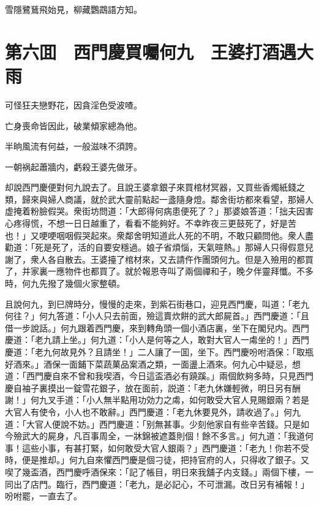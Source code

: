 雪隱鷺鶿飛始見，柳藏鸚鵡語方知。

\chapter*{第六囬　西門慶買囑何九　王婆打酒遇大雨}

可怪狂夫戀野花，因貪淫色受波喳。

亡身喪命皆因此，破業傾家總為他。

半晌風流有何益，一般滋味不須誇。

一朝祸起蕭牆内，虧殺王婆先做牙。

却說西門慶便對何九說去了。且說王婆拿銀子來買棺材冥器，又買些香燭紙錢之類，歸來與婦人商議，就於武大靈前點起一盞隨身燈。鄰舍街坊都來看望，那婦人虚掩着粉臉假哭。衆街坊問道：「大郎得何病患便死了？」那婆娘答道：「拙夫因害心疼得慌，不想一日日越重了，看看不能夠好。不幸昨夜三更鼓死了，好是苦也！」又哽哽咽咽假哭起來。衆鄰舍明知道此人死的不明，不敢只顧問他。衆人盡勸道：「死是死了，活的自要安穩過。娘子省煩惱，天氣暄熱。」那婦人只得假意兒謝了，衆人各自散去。王婆擡了棺材來，又去請仵作團頭何九。但是入殮用的都買了，并家裏一應物件也都買了。就於報恩寺叫了兩個禪和子，晚夕伴靈拜懺。不多時，何九先撥了幾個火家整頓。

且說何九，到巳牌時分，慢慢的走來，到紫石街巷口，迎見西門慶，叫道：「老九何往？」何九答道：「小人只去前面，殮這賣炊餅的武大郎屍首。」西門慶道：「且借一步說話。」何九跟着西門慶，來到轉角頭一個小酒店裏，坐下在閣兒内。西門慶道：「老九請上坐。」何九道：「小人是何等之人，敢對大官人一䖏坐的！」西門慶道：「老九何故見外？且請坐！」二人讓了一囬，坐下。西門慶吩咐酒保：「取瓶好酒來。」酒保一面鋪下菜蔬菓品案酒之類，一面盪上酒來。何九心中疑忌，想道：「西門慶自來不曾和我喫酒，今日這盃酒必有蹺蹊。」兩個飲夠多時，只見西門慶自袖子裏摸出一錠雪花銀子，放在面前，説道：「老九休嫌輕微，明日另有酬謝！」何九叉手道：「小人無半點用功効力之䖏，如何敢受大官人見賜銀兩？若是大官人有使令，小人也不敢辭。」西門慶道：「老九休要見外，請收過了。」何九道：「大官人便說不妨。」西門慶道：「别無甚事。少刻他家自有些辛苦錢。只是如今殮武大的屍身，凡百事周全，一牀錦被遮蓋則個！餘不多言。」何九道：「我道何事！這些小事，有甚打緊，如何敢受大官人銀兩？」西門慶道：「老九！你若不受時，便是推却。」何九自來懼西門慶是個刁徒，把持官府的人，只得收了銀子。又喫了幾盃酒，西門慶呼酒保來：「記了帳目，明日來我舖子内支錢。」兩個下樓，一同出了店門。臨行，西門慶道：「老九，是必記心，不可泄漏。改日另有補報！」吩咐罷，一直去了。


